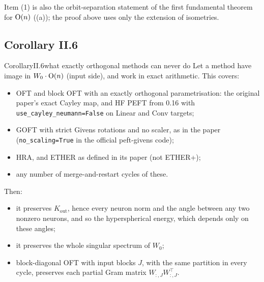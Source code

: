 \noindent Item (1) is also the orbit-separation statement of the first fundamental theorem for $\mathrm{O}(n)$
((a)); the proof above uses only the extension of isometries.

\subsection{Corollary II.6}\label{proof:II.6}

\begin{restate}{Corollary}{II.6}{what exactly orthogonal methods can never do}
Let a method have image in $W_0\cdot\mathrm{O}(n)$ (input side), and work in exact arithmetic. This covers:
\begin{itemize}
  \item OFT and block OFT with an exactly orthogonal parametrisation: the original paper's exact Cayley map, and HF PEFT
    from 0.16 with \texttt{use\_cayley\_\allowbreak neumann=False} on Linear and Conv targets;
  \item GOFT with strict Givens rotations and no scaler, as in the paper (\texttt{no\_scaling=True} in the official
    peft-givens code);
  \item HRA, and ETHER as defined in its paper (not ETHER+);
  \item any number of merge-and-restart cycles of these.
\end{itemize}
Then:
\begin{itemize}
  \item it preserves $K_{\mathrm{out}}$, hence every neuron norm and the angle between any two nonzero neurons, and so the
    hyperspherical energy, which depends only on these angles;
  \item it preserves the whole singular spectrum of $W_0$;
  \item block-diagonal OFT with input blocks $J$, with the same partition in every cycle, preserves each partial Gram
    matrix $W_{:,J}W_{:,J}^{\top}$.
\end{itemize}
\end{restate}

